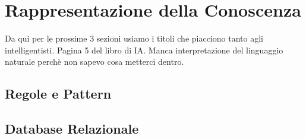 \section{Rappresentazione della Conoscenza}
Da qui per le prossime 3 sezioni usiamo i titoli che piacciono tanto 
agli intelligentisti. Pagina 5 del libro di IA. 
Manca interpretazione del linguaggio naturale perchè non sapevo cosa metterci dentro.
\subsection{Regole e Pattern}
\subsection{Database Relazionale}
